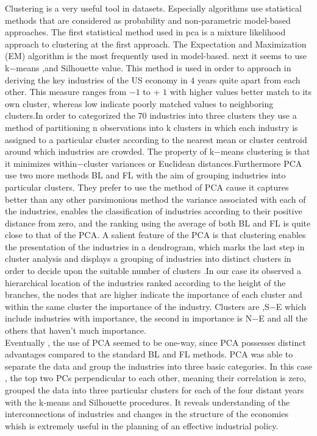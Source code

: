 \documentclass[10pt,a4paper]{article}
\begin{document}
	Clustering is a very useful tool in datasets. Especially algorithms use statistical methods that are considered as probability and non-parametric model-based approaches. The first statistical method used in pca is a mixture likelihood approach to clustering at the first approach. The Expectation and Maximization (EM) algorithm is the most frequently used in model-based. next it seems to use  k$-$means ,and Silhouette value. This method is used in order to  approach in deriving the key industries of the US economy in $4$ years quite apart from each other. This measure ranges from $- 1$ to + $1$ with higher values better match to its own cluster, whereas low indicate poorly matched values to neighboring clusters.In order to categorized the $70$ industries into three clusters they use  a method of partitioning n observations into k clusters in which each industry is assigned to a particular cluster according to the nearest mean or cluster centroid around which industries are crowded. The property of k$-$means clustering is that it minimizes within$-$cluster variances or Euclidean distances.Furthermore PCA use two more methods BL and FL with the aim of grouping industries into particular clusters. They prefer to use the method of PCA cause it captures better than any other parsimonious method the variance associated with each of the industries, enables the classification of industries according to their positive distance from zero, and the ranking using the average of both BL and FL is quite close to that of the PCA. A salient feature of the PCA is that clustering enables the presentation of the industries in a dendrogram, which marks the last step in cluster analysis and displays a grouping of industries into distinct clusters in order to  decide upon the suitable number of clusters .In our case its observed a hierarchical location of the industries ranked according to the height of the branches, the nodes that are higher indicate the importance of each cluster and within the same cluster the importance of the industry. Clusters are ,S$-$E which include industries with importance, the second in importance is N$-$E and all the others that haven't much importance.
	\\
	Eventually , the use of PCA seemed to be one-way, since PCA possesses distinct advantages compared to the standard BL and FL methods. PCA was able to separate the data and group the industries into three basic categories. In this case , the top two PCs perpendicular to each other, meaning their correlation is zero, grouped the data into three particular clusters for each of the four distant years with the k-means and Silhouette procedures. It reveals understanding of the interconnections of industries and changes in the structure of the economies whish is extremely useful in the planning of an effective industrial policy.
\end{document}
